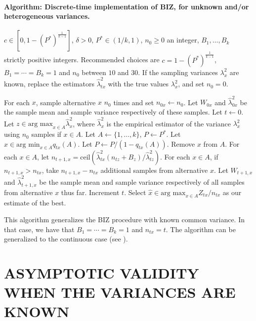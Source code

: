 \documentclass{wscpaperproc}
\newcommand{\lambdahat}{\widehat{\lambda}}
\newcommand{\xhat}{\hat{x}}
\newcommand{\upthresh}{P}
\newcommand{\cmax}{1-(P^*)^{\frac1{k-1}}}
\newcommand{\ceil}{\mathrm{ceil}}
\theoremstyle{wsc}
\providecommand{\DIFaddbegin}{} %
\providecommand{\DIFaddend}{} %
\begin{document}
\paragraph{Algorithm: Discrete-time implementation of BIZ, for unknown and/or heterogeneous variances.}    
\begin{algorithmic}[1]   
\label{alg:hetero-BIZ}   
\REQUIRE $c \in [0,\cmax]$, $\delta>0$, $P^*\in(1/k,1)$, $n_0\ge0$ an integer, $B_1,\ldots,B_k$ strictly positive integers.  Recommended choices are $c=\cmax$, $B_1=\cdots=B_k=1$ and $n_0$ between $10$ and $30$.     If the sampling variances $\lambda^2_x$ are known, replace the estimators     
$\lambdahat^2_{tx}$ with the true values $\lambda^2_x$, and set $n_0=0$.     

\STATE For each $x$, sample alternative $x$ $n_0$ times and set $n_{0x} \leftarrow n_0$.     
Let $W_{0x}$ and $\lambdahat^2_{0x}$ be the sample mean and sample variance respectively of these samples.     Let $t\leftarrow 0$. Let $z \in \mbox{arg max}_{x\in A} \lambdahat^2_{x}$, where $\lambdahat^2_{x}$ is the empirical estimator of the variance $\lambda^2_x$ using $n_0$ samples if $x\in A$.    
\STATE Let $A \leftarrow \{ 1,\ldots, k\}$, $\upthresh \leftarrow P^*$.
 \STATE Let $x\in\mbox{arg min}_{x\in A} q_{tx}\left(A\right)$.
    \STATE Let $\upthresh \leftarrow \upthresh/(1-q_{tx}\left(A\right))$.     
\STATE Remove $x$ from $A$.
\ENDWHILE    
\STATE For each $x\in A$, let      $n_{t+1,x} = \ceil\left( \lambdahat^2_{tx} (n_{tz} + B_z) / \lambdahat^2_{tz} \right)$.     \STATE For each $x\in A$, if $n_{t+1,x}>n_{tx}$, take $n_{t+1,x}-n_{tx}$ additional samples from alternative $x$.  Let $W_{t+1,x}$ and $\lambdahat^2_{t+1,x}$ be the sample mean and sample variance respectively of all samples from alternative $x$ thus far.    
\STATE Increment $t$.
 \ENDWHILE
  \STATE Select $\xhat \in\mbox{arg max}_{x\in A} Z_{tx} / n_{tx}$ as our estimate of the best.

   
\end{algorithmic} 
\hspace{5 mm}

This algorithm generalizes the BIZ procedure with known common variance. In that case, we have that $B_1=\cdots=B_k=1$ and $n_{tx}=t$. The algorithm can be generalized to the continuous case (see  ). 

\section{ASYMPTOTIC VALIDITY WHEN THE VARIANCES ARE KNOWN}
\DIFaddbegin \label{proof}
\DIFaddend 
\end{document}
